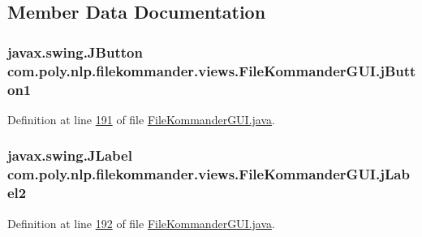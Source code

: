 \subsection{Member Data Documentation}
\hypertarget{classcom_1_1poly_1_1nlp_1_1filekommander_1_1views_1_1_file_kommander_g_u_i_a7fdc3f53573570f3f345be50e76a0f53}{
\subsubsection[{j\-Button1}]{\setlength{\rightskip}{0pt plus 5cm}javax.\-swing.\-J\-Button com.\-poly.\-nlp.\-filekommander.\-views.\-File\-Kommander\-G\-U\-I.\-j\-Button1\hspace{0.3cm}{\ttfamily [private]}}}\label{classcom_1_1poly_1_1nlp_1_1filekommander_1_1views_1_1_file_kommander_g_u_i_a7fdc3f53573570f3f345be50e76a0f53}


Definition at line \hyperlink{L191}{191} of file \hyperlink{}{File\-Kommander\-G\-U\-I.\-java}.

\hypertarget{classcom_1_1poly_1_1nlp_1_1filekommander_1_1views_1_1_file_kommander_g_u_i_abc00d454e82d9d65d52df7063d61fe99}{
\subsubsection[{j\-Label2}]{\setlength{\rightskip}{0pt plus 5cm}javax.\-swing.\-J\-Label com.\-poly.\-nlp.\-filekommander.\-views.\-File\-Kommander\-G\-U\-I.\-j\-Label2\hspace{0.3cm}{\ttfamily [private]}}}\label{classcom_1_1poly_1_1nlp_1_1filekommander_1_1views_1_1_file_kommander_g_u_i_abc00d454e82d9d65d52df7063d61fe99}


Definition at line \hyperlink{L192}{192} of file \hyperlink{}{File\-Kommander\-G\-U\-I.\-java}.

